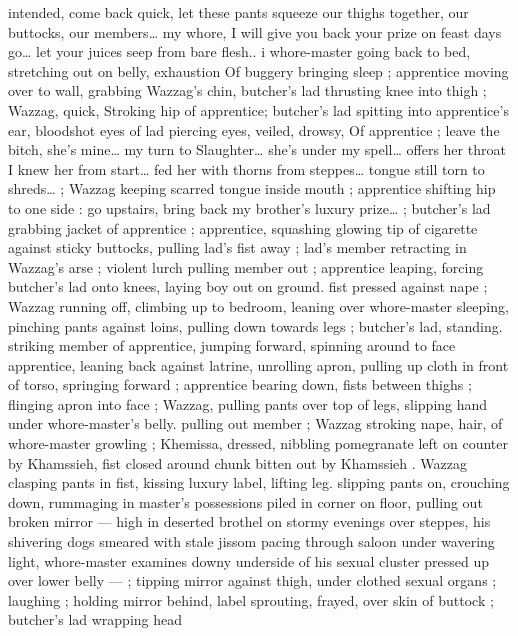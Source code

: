 {intended, come back quick, let these pants squeeze our thighs 
together, our buttocks, our members{\ldots} my whore, I will give you back 
your prize on feast days{\td} go{\ldots} let your juices seep from bare flesh..{\gr} 
i whore-master going back to bed, stretching out on belly, exhaustion 
Of buggery bringing sleep ; apprentice moving over to wall, grabbing 
Wazzag's chin, butcher's lad thrusting knee into thigh ; Wazzag, 
quick, Stroking hip of apprentice; butcher's lad spitting into 
apprentice's ear, bloodshot eyes of lad piercing eyes, veiled, drowsy, 
Of apprentice ; {\gl}{\td} leave the bitch, she's mine{\ldots} my turn to 
Slaughter{\ldots} she's under my spell{\ldots} offers her throat{\td} I knew her from 
start{\ldots} fed her with thorns from steppes{\ldots} tongue still torn to 
shreds{\ldots}{\gr} ; Wazzag keeping scarred tongue inside mouth ; 
apprentice shifting hip to one side : {\gl} go upstairs, bring back my 
brother's luxury prize{\ldots}{\gr} ; butcher's lad grabbing jacket of 
apprentice ; apprentice, squashing glowing tip of cigarette against 
sticky buttocks, pulling lad's fist away ; lad's member retracting in 
Wazzag's arse ; violent lurch pulling member out ; apprentice 
leaping, forcing butcher's lad onto knees, laying boy out on ground. 
fist pressed against nape ; Wazzag running off, climbing up to 
bedroom, leaning over whore-master sleeping, pinching pants 
against loins, pulling down towards legs ; butcher's lad, standing. 
striking member of apprentice, jumping forward, spinning around to 
face apprentice, leaning back against latrine, unrolling apron, pulling 
up cloth in front of torso, springing forward ; apprentice bearing 
down, fists between thighs ; flinging apron into face ; Wazzag, pulling 
pants over top of legs, slipping hand under whore-master's belly. 
pulling out member ; Wazzag stroking nape, hair, of whore-master 
growling ; Khemissa, dressed, nibbling pomegranate left on counter 
by Khamssieh, fist closed around chunk bitten out by Khamssieh . 
Wazzag clasping pants in fist, kissing luxury label, lifting leg. slipping 
pants on, crouching down, rummaging in master's possessions piled 
in corner on floor, pulling out broken mirror --- high in deserted 
brothel on stormy evenings over steppes, his shivering dogs 
smeared with stale jissom pacing through saloon under wavering 
light, whore-master examines downy underside of his sexual cluster 
pressed up over lower belly --- ; tipping mirror against thigh, under 
clothed sexual organs ; laughing ; holding mirror behind, label 
sprouting, frayed, over skin of buttock ; butcher's lad wrapping head 
}
